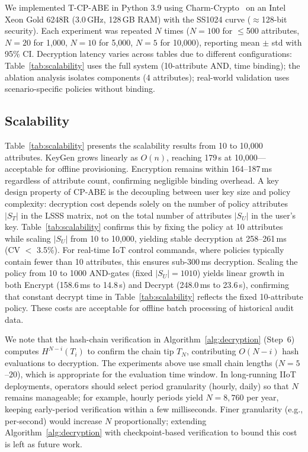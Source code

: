 ﻿\documentclass[lettersize,journal]{IEEEtran}
\begin{document}
We implemented T-CP-ABE in Python 3.9 using Charm-Crypto~\cite{Charm2013}
on an Intel Xeon Gold 6248R (3.0\,GHz, 128\,GB RAM) with the SS1024
curve ($\approx$128-bit security). Each experiment was repeated $N$
times ($N{=}100$ for $\leq$500 attributes, $N{=}20$ for 1,000, $N{=}10$
for 5,000, $N{=}5$ for 10,000), reporting mean $\pm$ std with 95\% CI.
Decryption latency varies across tables due to different configurations:
Table~\ref{tab:scalability} uses the full system (10-attribute AND, time
binding); the ablation analysis isolates components (4 attributes);
real-world validation uses scenario-specific policies without binding.

\subsection{Scalability}
\label{subsec:scalability}

Table~\ref{tab:scalability} presents the
scalability results from 10 to 10,000 attributes. KeyGen grows linearly
as $O(n)$, reaching 179\,s at 10,000---acceptable for offline
provisioning. Encryption remains within 164--187\,ms regardless of
attribute count, confirming negligible binding overhead. A key design
property of CP-ABE is the decoupling between user key size and policy
complexity: decryption cost depends solely on the number of policy
attributes $|S_T|$ in the LSSS matrix, not on the total number of
attributes $|S_U|$ in the user's key. Table~\ref{tab:scalability}
confirms this by fixing the policy at 10 attributes while scaling
$|S_U|$ from 10 to 10,000, yielding stable decryption at 258--261\,ms
(CV $<$ 3.5\%). For real-time IoT control commands, where policies
typically contain fewer than 10 attributes, this ensures sub-300\,ms
decryption. Scaling the policy from 10 to 1000 AND-gates
(fixed $|S_U|\!=\!1010$) yields linear growth in both Encrypt
(158.6\,ms to 14.8\,s) and Decrypt (248.0\,ms to 23.6\,s), confirming
that constant decrypt time in Table~\ref{tab:scalability} reflects the
fixed 10-attribute policy. These costs are acceptable
for offline batch processing of historical audit data.

We note that the hash-chain verification in Algorithm~\ref{alg:decryption} (Step~6)
computes $H^{N-i}(T_i)$ to confirm the chain tip $T_N$, contributing
$O(N{-}i)$ hash evaluations to decryption.  The experiments above use
small chain lengths ($N = 5$--$20$), which is appropriate for the
evaluation time window.  In long-running IIoT deployments, operators
should select period granularity (hourly, daily) so that $N$ remains
manageable; for example, hourly periods yield $N = 8{,}760$ per year,
keeping early-period verification within a few milliseconds.  Finer
granularity (e.g., per-second) would increase $N$ proportionally;
extending Algorithm~\ref{alg:decryption} with checkpoint-based verification to bound
this cost is left as future work.
\end{document}
